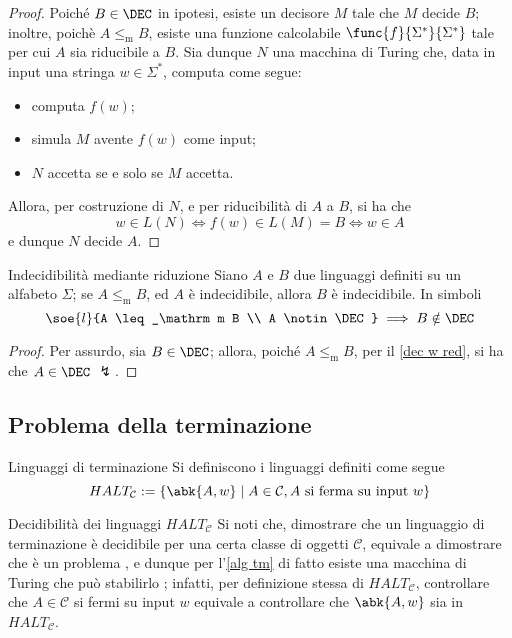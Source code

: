\documentclass[a4paper, 12pt]{report}
\begin{document}
    \begin{proof}
        Poiché $B \in \DEC$ in ipotesi, esiste un decisore $M$ tale che $M$ decide $B$; inoltre, poichè $A \leq_\mathrm m B$, esiste una funzione calcolabile $\func{f}{\Sigma^*}{\Sigma^*}$ tale per cui $A$ sia riducibile a $B$. Sia dunque $N$ una macchina di Turing che, data in input una stringa $w \in \Sigma^*$, computa come segue:

        \begin{itemize}
            \item computa $f(w)$;
            \item simula $M$ avente $f(w)$ come input; 
            \item $N$ accetta se e solo se $M$ accetta.
        \end{itemize}

        Allora, per costruzione di $N$, e per riducibilità di $A$ a $B$, si ha che $$w \in L(N) \iff f(w) \in L(M) = B \iff w \in A$$ e dunque $N$ decide $A$.
    \end{proof}

    \begin{framedcor}[label={dec w red cor}]{Indecidibilità mediante riduzione}
        Siano $A$ e $B$ due linguaggi definiti su un alfabeto $\Sigma$; se $A \leq_\mathrm m B$, ed $A$ è indecidibile, allora $B$ è indecidibile. In simboli $$\soe{l}{A \leq_\mathrm m B \\ A \notin \DEC} \implies B \notin \DEC$$
    \end{framedcor}

    \begin{proof}
        Per assurdo, sia $B \in \DEC$; allora, poiché $A \leq_\mathrm m B$, per il \cref{dec w red}, si ha che $A \in \DEC$ $\lightning$.
    \end{proof}

    \subsection{Problema della terminazione}

    \begin{frameddefn}{Linguaggi di terminazione}
        Si definiscono  i linguaggi definiti come segue $$HALT_\mathcal{C} := \{\abk{A, w} \mid A \in \mathcal{C} , A \ \textrm{si ferma su input} \ w\}$$
    \end{frameddefn}

    \begin{framedobs}{Decidibilità dei linguaggi $HALT_\mathcal C$}
        Si noti che, dimostrare che un linguaggio di terminazione è decidibile per una certa classe di oggetti $\mathcal{C}$, equivale a dimostrare che  è un problema , e dunque per l'\cref{alg tm} di fatto esiste una macchina di Turing che può stabilirlo ; infatti, per definizione stessa di $HALT_\mathcal C$, controllare che $A \in \mathcal{C}$ si fermi su input $w$ equivale a controllare che $\abk{A,w}$ sia in $HALT_\mathcal{C}$.
    \end{framedobs}
\end{document}

